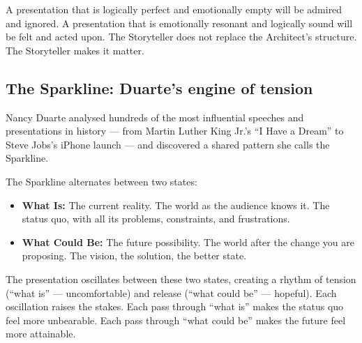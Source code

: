 \begin{thesisbox}
A presentation that is logically perfect and emotionally empty will be admired and ignored. A presentation that is emotionally resonant and logically sound will be felt and acted upon. The Storyteller does not replace the Architect's structure. The Storyteller makes it matter.
\end{thesisbox}


\subsection{The Sparkline: Duarte's engine of tension}



Nancy Duarte analysed hundreds of the most influential speeches and presentations in history --- from Martin Luther King Jr.'s ``I Have a Dream'' to Steve Jobs's iPhone launch --- and discovered a shared pattern she calls the Sparkline.

The Sparkline alternates between two states:

\begin{itemize}
  \item \textbf{What Is:} The current reality. The world as the audience knows it. The status quo, with all its problems, constraints, and frustrations.
  \item \textbf{What Could Be:} The future possibility. The world after the change you are proposing. The vision, the solution, the better state.
\end{itemize}

The presentation oscillates between these two states, creating a rhythm of tension (``what is'' --- uncomfortable) and release (``what could be'' --- hopeful). Each oscillation raises the stakes. Each pass through ``what is'' makes the status quo feel more unbearable. Each pass through ``what could be'' makes the future feel more attainable.

